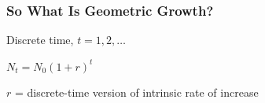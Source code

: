 \documentclass[color=usenames,dvipsnames]{beamer}\usepackage[]{graphicx}\usepackage[]{color}
\begin{document}
\begin{frame}
  \frametitle{So What Is Geometric Growth?}
    \begin{block}{Discrete time, $t=1,2,\ldots$}
     \begin{center}
       \Large
       $N_t = N_0(1+r)^t$
     \end{center}
     $r$ = discrete-time version of intrinsic rate of increase
   \end{block}
\end{frame}
\end{document}

